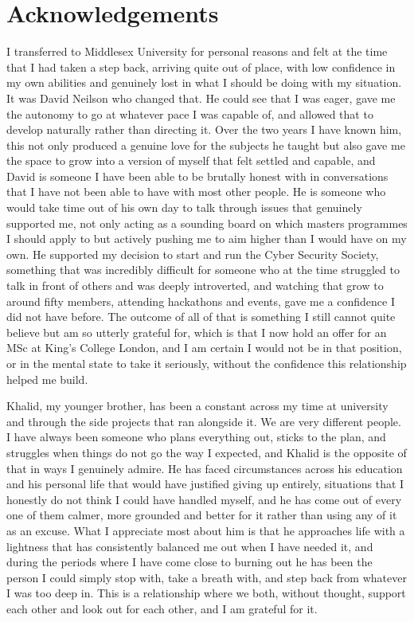 \documentclass[12pt, a4paper, oneside]{report}
\begin{document}
\chapter*{Acknowledgements}

I transferred to Middlesex University for personal reasons and felt at the time that I had taken a step back, arriving quite out of place, with low confidence in my own abilities and genuinely lost in what I should be doing with my situation. It was David Neilson who changed that. He could see that I was eager, gave me the autonomy to go at whatever pace I was capable of, and allowed that to develop naturally rather than directing it. Over the two years I have known him, this not only produced a genuine love for the subjects he taught but also gave me the space to grow into a version of myself that felt settled and capable, and David is someone I have been able to be brutally honest with in conversations that I have not been able to have with most other people. He is someone who would take time out of his own day to talk through issues that genuinely supported me, not only acting as a sounding board on which masters programmes I should apply to but actively pushing me to aim higher than I would have on my own. He supported my decision to start and run the Cyber Security Society, something that was incredibly difficult for someone who at the time struggled to talk in front of others and was deeply introverted, and watching that grow to around fifty members, attending hackathons and events, gave me a confidence I did not have before. The outcome of all of that is something I still cannot quite believe but am so utterly grateful for, which is that I now hold an offer for an MSc at King's College London, and I am certain I would not be in that position, or in the mental state to take it seriously, without the confidence this relationship helped me build.

Khalid, my younger brother, has been a constant across my time at university and through the side projects that ran alongside it. We are very different people. I have always been someone who plans everything out, sticks to the plan, and struggles when things do not go the way I expected, and Khalid is the opposite of that in ways I genuinely admire. He has faced circumstances across his education and his personal life that would have justified giving up entirely, situations that I honestly do not think I could have handled myself, and he has come out of every one of them calmer, more grounded and better for it rather than using any of it as an excuse. What I appreciate most about him is that he approaches life with a lightness that has consistently balanced me out when I have needed it, and during the periods where I have come close to burning out he has been the person I could simply stop with, take a breath with, and step back from whatever I was too deep in. This is a relationship where we both, without thought, support each other and look out for each other, and I am grateful for it.
\end{document}
